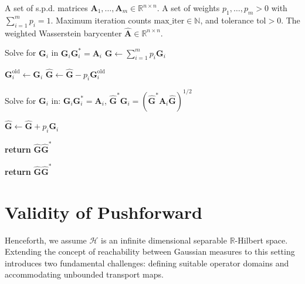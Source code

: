 \documentclass[noinfoline]{imsart}\setcounter{tocdepth}{2}
\renewcommand{\b}[1]{\mathbb{#1}} %
\newcommand{\m}[1]{\mathbf{#1}} %
\renewcommand{\c}[1]{\mathcal{#1}} %
\DeclareMathOperator*{\tr}{tr}
\theoremstyle{plain}
\begin{document}
\begin{algorithm}[h!]
\caption{Weighted Wasserstein Barycenter Algorithm}
\label{alg:wba}
\begin{algorithmic}[1]
\Require
    \Statex A set of s.p.d. matrices $\m{A}_{1}, \dots, \m{A}_{m} \in \b{R}^{n \times n}$.
    \Statex A set of weights $p_{1}, \dots, p_{m} > 0$ with $\sum_{i=1}^{m} p_{i} = 1$.
    \Statex Maximum iteration counts $\text{max\_iter} \in \b{N}$, and tolerance $\text{tol} > 0$.
\Ensure
    \Statex The weighted Wasserstein barycenter $\hat{\m{A}} \in \b{R}^{n \times n}$.

\Statex
\Statex {}
    \State Solve for $\m{G}_{i}$ in $\m{G}_{i} \m{G}_{i}^{*} = \m{A}_{i}$ 
\EndFor
\State $\hat{\m{G}} \gets \sum_{i=1}^{m} p_i \m{G}_i$ 

\Statex
\Statex {}
        \State $\m{G}_i^{\text{old}} \gets \m{G}_i$
        \State $\hat{\m{G}} \gets \hat{\m{G}} - p_i \m{G}_i^{\text{old}}$ 
        
        \State Solve for $\m{G}_i$ in: $\m{G}_i \m{G}_i^{*} = \m{A}_i$,  $\hat{\m{G}}^* \m{G}_i = (\hat{\m{G}}^* \m{A}_i \hat{\m{G}})^{1/2}$ 
        
        \State $\hat{\m{G}} \gets \hat{\m{G}} + p_i \m{G}_i$ 

        \If{$\tr[\hat{\m{G}}^* (\m{G}_i - \m{G}_i^{\text{old}})] < \text{tol}$}
            \State \textbf{return} $\hat{\m{G}} \hat{\m{G}}^*$ 
        \EndIf
    \EndFor
\EndFor

\State \textbf{return} $\hat{\m{G}} \hat{\m{G}}^*$ 
\end{algorithmic}
\end{algorithm}













\section{Validity of Pushforward}\label{sec:admissible}
Henceforth, we assume $\c{H}$ is an infinite dimensional separable $\b{R}$-Hilbert space. 
Extending the concept of reachability between Gaussian measures to this setting introduces two fundamental challenges: defining suitable operator domains and accommodating unbounded transport maps.
\end{document}
